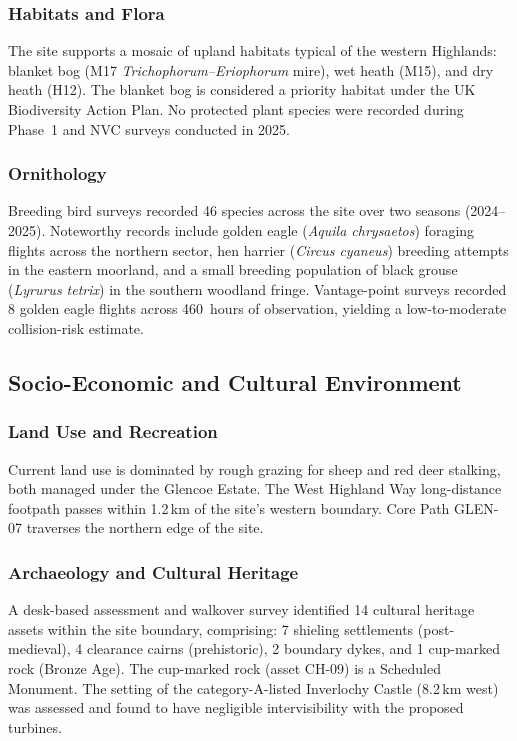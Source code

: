 \subsubsection{Habitats and Flora}
The site supports a mosaic of upland habitats typical of the western Highlands: blanket bog (M17 \textit{Trichophorum--Eriophorum} mire), wet heath (M15), and dry heath (H12). The blanket bog is considered a priority habitat under the UK Biodiversity Action Plan. No protected plant species were recorded during Phase~1 and NVC surveys conducted in 2025.

\subsubsection{Ornithology}
Breeding bird surveys recorded 46 species across the site over two seasons (2024--2025). Noteworthy records include golden eagle (\textit{Aquila chrysaetos}) foraging flights across the northern sector, hen harrier (\textit{Circus cyaneus}) breeding attempts in the eastern moorland, and a small breeding population of black grouse (\textit{Lyrurus tetrix}) in the southern woodland fringe. Vantage-point surveys recorded 8 golden eagle flights across 460~hours of observation, yielding a low-to-moderate collision-risk estimate.

\subsection{Socio-Economic and Cultural Environment}

\subsubsection{Land Use and Recreation}
Current land use is dominated by rough grazing for sheep and red deer stalking, both managed under the Glencoe Estate. The West Highland Way long-distance footpath passes within 1.2\,km of the site's western boundary. Core Path GLEN-07 traverses the northern edge of the site.

\subsubsection{Archaeology and Cultural Heritage}
A desk-based assessment and walkover survey identified 14 cultural heritage assets within the site boundary, comprising: 7 shieling settlements (post-medieval), 4 clearance cairns (prehistoric), 2 boundary dykes, and 1 cup-marked rock (Bronze Age). The cup-marked rock (asset CH-09) is a Scheduled Monument. The setting of the category-A-listed Inverlochy Castle (8.2\,km west) was assessed and found to have negligible intervisibility with the proposed turbines.

